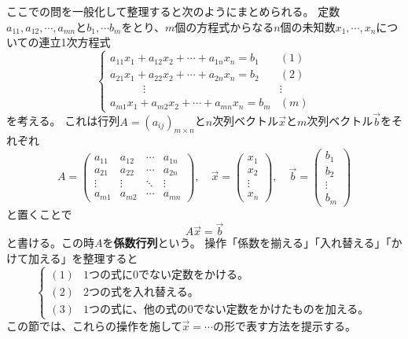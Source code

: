 \documentclass[10pt]{jsarticle}
\theoremstyle{definition}%
\newcommand{\kakko}[1]{\left(#1 \right)} %
\newcommand{\vc}[1]{\overrightarrow{#1}}%
\numberwithin{equation}{section}%
\begin{document}
ここでの問を一般化して整理すると次のようにまとめられる。
定数$a_{11},a_{12},\cdots, a_{mn}$と$b_{1},\cdots b_{m}$をとり、$m$個の方程式からなる$n$個の未知数$x_{1},\cdots, x_{n}$についての連立1次方程式
\begin{equation}
  \label{renho-ippan}  \begin{cases}
      a_{11}x_{1}+a_{12}x_{2}+\cdots +a_{1n}x_{n} =b_{1} &  (1)\\
      a_{21}x_{1}+a_{22}x_{2}+\cdots +a_{2n}x_{n} =b_{2} &  (2)\\
      \quad \quad \quad   \vdots & \vdots \\
      a_{m1}x_{1}+a_{m2}x_{2}+\cdots +a_{mn}x_{n} =b_{m} &  (m)
    \end{cases} 
  \end{equation}
を考える。
これは行列$A=(a_{ij})_{m\times n}$と$n$次列ベクトル$\vc{x}$と$m$次列ベクトル$\vc{b}$をそれぞれ
\begin{equation}
  A= \kakko{\begin{matrix}
    a_{11} & a_{12} & \cdots & a_{1n} \\
    a_{21} & a_{22} & \cdots & a_{2n} \\
    \vdots & \vdots & \ddots & \vdots \\
    a_{m1} & a_{m2} &\cdots & a_{mn}
  \end{matrix}},\quad \vc{x}=\kakko{\begin{matrix}
    x_{1}\\
    x_{2}\\
    \vdots\\
    x_{n}
  \end{matrix}},\quad \vc{b}=\kakko{\begin{matrix}
    b_{1}\\
    b_{2}\\
    \vdots\\
    b_{m}
  \end{matrix}}
\end{equation}
と置くことで
\begin{equation}
\label{renho1}  A\vc{x}=\vc{b}
\end{equation}
と書ける。この時$A$を{\bf 係数行列}という。
操作「係数を揃える」「入れ替える」「かけて加える」を整理すると
\begin{equation}
\label{op}  \begin{cases}
    (1) & \text{1つの式に0でない定数をかける。}\\
    (2) & \text{2つの式を入れ替える。}\\
    (3) & \text{1つの式に、他の式の0でない定数をかけたものを加える。}
  \end{cases}
\end{equation}
この節では、これらの操作を施して$\vc{x}=\cdots$の形で表す方法を提示する。
\end{document}
